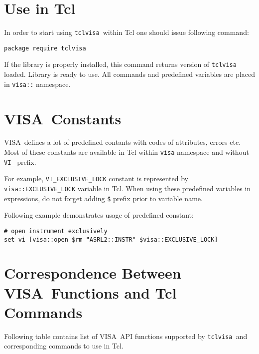 \documentclass[12pt, a4paper]{book}
\newcommand{\tclvisa}{{\tt tclvisa }}
\newcommand{\VISA}{\mbox{VISA }}
\begin{document}
\section{Use in Tcl}

In order to start using \tclvisa within Tcl one should issue following command:

\begin{verbatim} 
package require tclvisa
\end{verbatim} 

If the library is properly installed, this command returns version of \tclvisa loaded. Library is ready to use. All commands and predefined variables are placed in {\tt visa::} namespace.

\section{\VISA Constants}

\VISA defines a lot of predefined contants with codes of attributes, errors etc. Most of these constants are available in Tcl within {\tt visa} namespace and without {\tt VI\_} prefix.

For example, {\tt VI\_EXCLUSIVE\_LOCK} constant is represented by \\{\tt visa::EXCLUSIVE\_LOCK} variable in Tcl. When using these predefined variables in expressions, do not forget adding {\tt \$} prefix prior to variable name.

Following example demonstrates usage of predefined constant:

\begin{verbatim} 
# open instrument exclusively
set vi [visa::open $rm "ASRL2::INSTR" $visa::EXCLUSIVE_LOCK]
\end{verbatim} 

\section{Correspondence Between \VISA Functions and Tcl Commands}

Following table contains list of \VISA API functions supported by \tclvisa and corresponding commands to use in Tcl.
\end{document}
